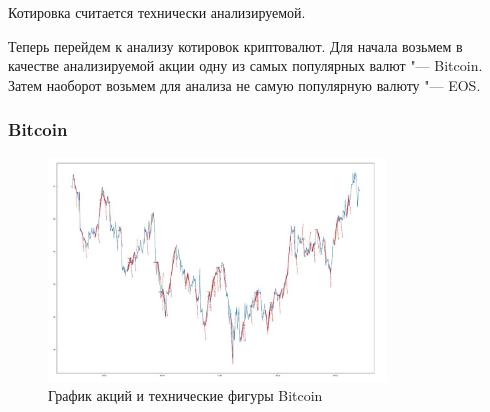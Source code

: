 \documentclass[bachelor, och, coursework]{SCWorks}
\begin{document}
        Котировка считается технически анализируемой.

        Теперь перейдем к анализу котировок криптовалют. Для начала возьмем в
        качестве анализируемой акции одну из самых популярных валют "--- 
        Bitcoin. Затем наоборот возьмем для анализа не самую популярную валюту
        "--- EOS.

        \subsubsection{Bitcoin}
    
        \begin{figure}[H]
            \centering
            \includegraphics[width=0.8\textwidth]{pic/BTC.jpg}
            \caption{График акций и технические фигуры Bitcoin}
        \end{figure}

        \pagebreak
        
\end{document}
